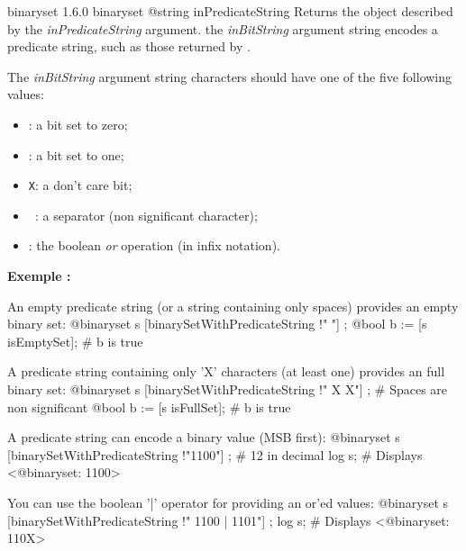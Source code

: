 {binaryset}
{1.6.0}
{binaryset}
{@string inPredicateString}
{Returns the  object described by the \emph{inPredicateString} argument.}
{the \emph{inBitString} argument string encodes a predicate string, such as those returned by .}
\begin{description}
\item The \emph{inBitString} argument string characters should have one of the five following values:
\begin{itemize}
\item \texttt{\textquotesingle}: a bit set to zero;
\item \texttt{\textquotesingle}: a bit set to one;
\item \texttt{\textquotesingle X\textquotesingle}: a don't care bit;
\item \texttt{\textquotesingle~\textquotesingle}: a separator (non significant character);
\item \texttt{\textquotesingle\textbar\textquotesingle}: the boolean \emph{or} operation (in infix notation).
\end{itemize}
\end{description}


\textbf{Exemple :}
\begin{galgascode}
An empty predicate string (or a string containing only spaces) provides an empty binary set:
@binaryset s [binarySetWithPredicateString !" "] ;
@bool b := [s isEmptySet]; # b is true
\end{galgascode}


\begin{galgascode}
A predicate string containing only 'X' characters (at least one) provides an full binary set:
@binaryset s [binarySetWithPredicateString !" X X"] ; # Spaces are non significant
@bool b := [s isFullSet]; # b is true
\end{galgascode}


\begin{galgascode}
A predicate string can encode a binary value (MSB first):
@binaryset s [binarySetWithPredicateString !"1100"] ; # 12 in decimal
log s; # Displays <@binaryset: 1100>
\end{galgascode}


\begin{galgascode}
You can use the boolean '|' operator for providing an or'ed values:
@binaryset s [binarySetWithPredicateString !" 1100 | 1101"] ;
log s; # Displays <@binaryset: 110X>
\end{galgascode}



